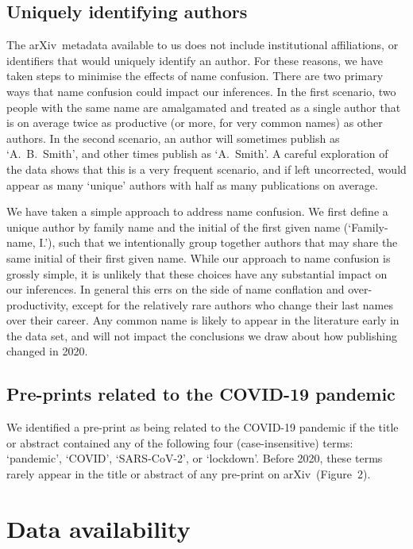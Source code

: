 \documentclass[a4paper,12pt]{article}
\newcommand{\arxiv}{arXiv}
\begin{document}
\subsection*{Uniquely identifying authors}

The \arxiv\ metadata available to us does not include institutional affiliations, or identifiers that would uniquely identify an author. For these reasons, we have taken steps to minimise the effects of name confusion. There are two primary ways that name confusion could impact our inferences. In the first scenario, two people with the same name are amalgamated and treated as a single author that is on average twice as productive (or more, for very common names) as other authors. In the second scenario, an author will sometimes publish as `A.~B.~Smith', and other times publish as `A.~Smith'. A careful exploration of the data shows that this is a very frequent scenario, and if left uncorrected, would appear as many `unique' authors with half as many publications on average.

We have taken a simple approach to address name confusion. We first define a unique author by family name and the initial of the first given name (`Family-name, I.'), such that we intentionally group together authors that may share the same initial of their first given name. 
While our approach to name confusion is grossly simple, it is unlikely that these choices have any substantial impact on our inferences. In general this errs on the side of name conflation and over-productivity, except for the relatively rare authors who change their last names over their career.
Any common name is likely to appear in the literature early in the data set, and will not impact the conclusions we draw about how publishing changed in 2020. 

\subsection*{Pre-prints related to the COVID-19 pandemic}

We identified a pre-print as being related to the COVID-19 pandemic if the title or abstract contained any of the following four (case-insensitive) terms: `pandemic', `COVID', `SARS-CoV-2', or `lockdown'. Before 2020, these terms rarely appear in the title or abstract of any pre-print on \arxiv\ (Figure~2).

\section*{Data availability}
\end{document}
